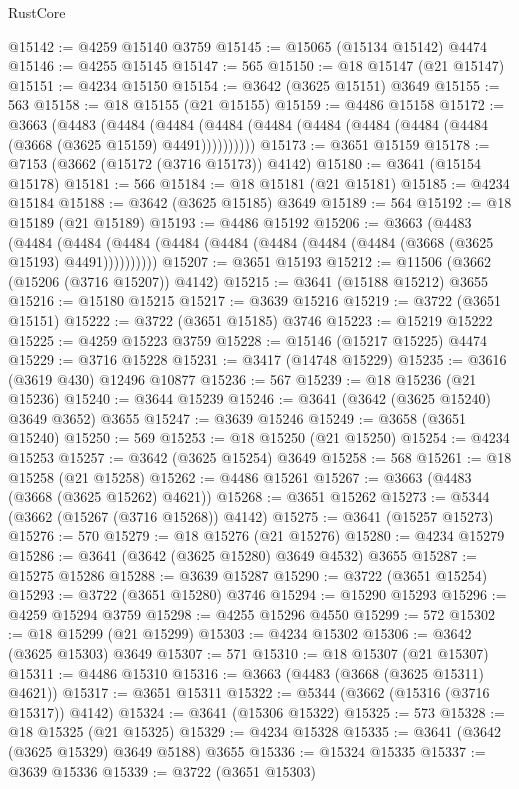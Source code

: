 \begin{lexlean}{RustCore}
\begin{coremodule}
@15142 := @4259 @15140 @3759
@15145 := @15065 (@15134 @15142) @4474
@15146 := @4255 @15145
@15147 := 565
@15150 := @18 @15147 (@21 @15147)
@15151 := @4234 @15150
@15154 := @3642 (@3625 @15151) @3649
@15155 := 563
@15158 := @18 @15155 (@21 @15155)
@15159 := @4486 @15158
@15172 := @3663
    (@4483
      (@4484 (@4484 (@4484 (@4484 (@4484 (@4484 (@4484 (@4484 (@3668 (@3625 @15159) @4491))))))))))
@15173 := @3651 @15159
@15178 := @7153 (@3662 (@15172 (@3716 @15173)) @4142)
@15180 := @3641 (@15154 @15178)
@15181 := 566
@15184 := @18 @15181 (@21 @15181)
@15185 := @4234 @15184
@15188 := @3642 (@3625 @15185) @3649
@15189 := 564
@15192 := @18 @15189 (@21 @15189)
@15193 := @4486 @15192
@15206 := @3663
    (@4483
      (@4484 (@4484 (@4484 (@4484 (@4484 (@4484 (@4484 (@4484 (@3668 (@3625 @15193) @4491))))))))))
@15207 := @3651 @15193
@15212 := @11506 (@3662 (@15206 (@3716 @15207)) @4142)
@15215 := @3641 (@15188 @15212) @3655
@15216 := @15180 @15215
@15217 := @3639 @15216
@15219 := @3722 (@3651 @15151)
@15222 := @3722 (@3651 @15185) @3746
@15223 := @15219 @15222
@15225 := @4259 @15223 @3759
@15228 := @15146 (@15217 @15225) @4474
@15229 := @3716 @15228
@15231 := @3417 (@14748 @15229)
@15235 := @3616 (@3619 @430) @12496 @10877
@15236 := 567
@15239 := @18 @15236 (@21 @15236)
@15240 := @3644 @15239
@15246 := @3641 (@3642 (@3625 @15240) @3649 @3652) @3655
@15247 := @3639 @15246
@15249 := @3658 (@3651 @15240)
@15250 := 569
@15253 := @18 @15250 (@21 @15250)
@15254 := @4234 @15253
@15257 := @3642 (@3625 @15254) @3649
@15258 := 568
@15261 := @18 @15258 (@21 @15258)
@15262 := @4486 @15261
@15267 := @3663 (@4483 (@3668 (@3625 @15262) @4621))
@15268 := @3651 @15262
@15273 := @5344 (@3662 (@15267 (@3716 @15268)) @4142)
@15275 := @3641 (@15257 @15273)
@15276 := 570
@15279 := @18 @15276 (@21 @15276)
@15280 := @4234 @15279
@15286 := @3641 (@3642 (@3625 @15280) @3649 @4532) @3655
@15287 := @15275 @15286
@15288 := @3639 @15287
@15290 := @3722 (@3651 @15254)
@15293 := @3722 (@3651 @15280) @3746
@15294 := @15290 @15293
@15296 := @4259 @15294 @3759
@15298 := @4255 @15296 @4550
@15299 := 572
@15302 := @18 @15299 (@21 @15299)
@15303 := @4234 @15302
@15306 := @3642 (@3625 @15303) @3649
@15307 := 571
@15310 := @18 @15307 (@21 @15307)
@15311 := @4486 @15310
@15316 := @3663 (@4483 (@3668 (@3625 @15311) @4621))
@15317 := @3651 @15311
@15322 := @5344 (@3662 (@15316 (@3716 @15317)) @4142)
@15324 := @3641 (@15306 @15322)
@15325 := 573
@15328 := @18 @15325 (@21 @15325)
@15329 := @4234 @15328
@15335 := @3641 (@3642 (@3625 @15329) @3649 @5188) @3655
@15336 := @15324 @15335
@15337 := @3639 @15336
@15339 := @3722 (@3651 @15303)

\end{coremodule}
\end{lexlean}
